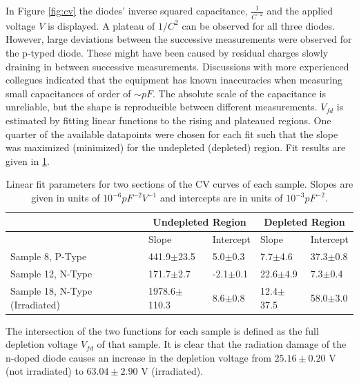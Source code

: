 \documentclass[11pt,a4paper]{report}
\begin{document}
In Figure \ref{fig:cv} the diodes' inverse squared capacitance, $\frac{1}{C^{-2}}$ and the applied voltage $V$ is displayed.
A plateau of $1/C^2$ can be observed for all three diodes.
However, large deviations between the successive measurements were observed for the p-typed diode. These might have been caused by residual charges slowly draining in between successive measurements.
Discussions with more experienced collegues indicated that the equipment has known inaccuracies when measuring small capacitances of order of $\sim pF$. The absolute scale of the capacitance is unreliable, but the shape is reproducible between different measurements.
$V_{fd}$ is estimated by fitting linear functions to the rising and plateaued regions. One quarter of the available datapoints were chosen for each fit such that the slope was maximized (minimized) for the undepleted (depleted) region. Fit results are given in \ref{tab:fits}.

\begin{table}[]
\centering
\caption{Linear fit parameters for two sections of the CV curves of each sample. Slopes are given in units of $10^{-6}pF^{-2}V^{-1}$ and intercepts are in units of $10^{-3}pF^{-2}$.}\label{tab:fits}
\begin{tabular}{lllll}
    \toprule
    & \multicolumn{2}{c}{Undepleted Region}   & \multicolumn{2}{c}{Depleted Region}  \\
    \midrule
    & Slope & Intercept & Slope & Intercept \\
    \midrule
    Sample 8, P-Type                & 441.9$\pm$23.5    & 5.0$\pm$0.3     & 7.7$\pm$4.6     & 37.3$\pm$0.8  \\
    Sample 12, N-Type               & 171.7$\pm$2.7     & -2.1$\pm$0.1    & 22.6$\pm$4.9    & 7.3$\pm$0.4   \\
    Sample 18, N-Type (Irradiated)  & 1978.6$\pm$110.3   & 8.6$\pm$0.8  & 12.4$\pm$37.5   & 58.0$\pm$3.0    \\
    \bottomrule
\end{tabular}
\end{table}

The intersection of the two functions for each sample is defined as the full depletion voltage $V_{fd}$ of that sample.
It is clear that the radiation damage of the n-doped diode causes an increase in the depletion voltage from $25.16\pm0.20$ V (not irradiated) to $63.04\pm2.90$ V (irradiated).
\end{document}
